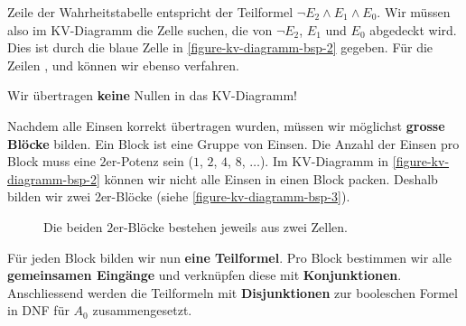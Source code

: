 \begin{example}
Zeile  der Wahrheitstabelle entspricht der Teilformel $\neg E_2 \wedge E_1 \wedge E_0$. Wir müssen also im \acs{KV}-Diagramm die Zelle suchen, die von $\neg E_2$, $E_1$ und $E_0$ abgedeckt wird. Dies ist durch die blaue Zelle in \autoref{figure-kv-diagramm-bsp-2} gegeben. Für die Zeilen ,  und  können wir ebenso verfahren.

\begin{important}
Wir übertragen \textbf{keine} Nullen in das \ac{KV}-Diagramm!
\end{important}

Nachdem alle Einsen korrekt übertragen wurden, müssen wir möglichst \textbf{grosse Blöcke} bilden. Ein Block ist eine Gruppe von Einsen. Die Anzahl der Einsen pro Block muss eine $2$er-Potenz sein ($1$, $2$, $4$, $8$, $\dots$). Im \ac{KV}-Diagramm in \autoref{figure-kv-diagramm-bsp-2} können wir nicht alle Einsen in einen Block packen. Deshalb bilden wir zwei $2$er-Blöcke (siehe \autoref{figure-kv-diagramm-bsp-3}).

\begin{figure}[htb]
\centering
{}
\caption{Die beiden $2$er-Blöcke bestehen jeweils aus zwei Zellen.}
\label{figure-kv-diagramm-bsp-3}
\end{figure}

\newpage

Für jeden Block bilden wir nun \textbf{eine Teilformel}. Pro Block bestimmen wir alle \textbf{gemeinsamen Eingänge} und verknüpfen diese mit \textbf{Konjunktionen}. Anschliessend werden die Teilformeln mit \textbf{Disjunktionen} zur booleschen Formel in \ac{DNF} für $A_0$ zusammengesetzt.


\end{example}
